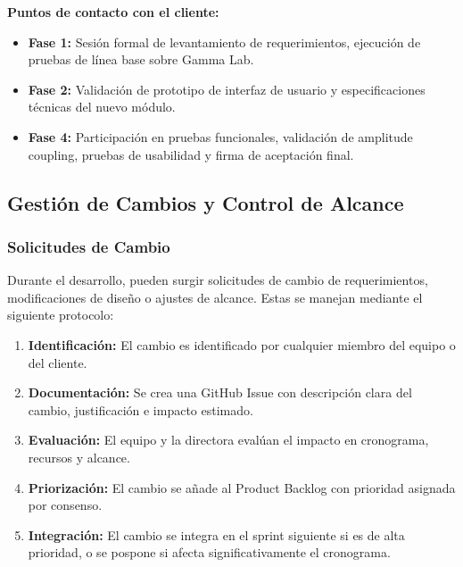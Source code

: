 \documentclass{article}
\begin{document}
\textbf{Puntos de contacto con el cliente:}

\begin{itemize}
    \item \textbf{Fase 1:} Sesión formal de levantamiento de requerimientos, ejecución de pruebas de línea base sobre Gamma Lab.
    
    \item \textbf{Fase 2:} Validación de prototipo de interfaz de usuario y especificaciones técnicas del nuevo módulo.
    
    \item \textbf{Fase 4:} Participación en pruebas funcionales, validación de amplitude coupling, pruebas de usabilidad y firma de aceptación final.
\end{itemize}

\subsection{Gestión de Cambios y Control de Alcance}

\subsubsection{Solicitudes de Cambio}

Durante el desarrollo, pueden surgir solicitudes de cambio de requerimientos, modificaciones de diseño o ajustes de alcance. Estas se manejan mediante el siguiente protocolo:

\begin{enumerate}
    \item \textbf{Identificación:} El cambio es identificado por cualquier miembro del equipo o del cliente.
    
    \item \textbf{Documentación:} Se crea una GitHub Issue con descripción clara del cambio, justificación e impacto estimado.
    
    \item \textbf{Evaluación:} El equipo y la directora evalúan el impacto en cronograma, recursos y alcance.
    
    \item \textbf{Priorización:} El cambio se añade al Product Backlog con prioridad asignada por consenso.
    
    \item \textbf{Integración:} El cambio se integra en el sprint siguiente si es de alta prioridad, o se pospone si afecta significativamente el cronograma.
\end{enumerate}
\end{document}
